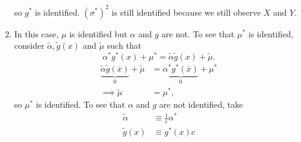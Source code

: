 \documentclass{article}
\begin{document}
\begin{enumerate}
\[\]
so $g^\ast$ is identified. $(\sigma^\ast)^2$ is still identified because we still observe $X$ and $Y$.
\item In this case, $\mu$ is identified but $\alpha$ and $g$ are not. To see that $\mu^\ast$ is identified, consider $\tilde{\alpha}, \tilde{g}(x)$ and $\tilde{\mu}$ such that
  \[
\alpha^\ast g^\ast(x) + \mu^\ast = \tilde{\alpha}\tilde{g}(x) + \tilde{\mu}.
\]
\begin{align*}
  \underbrace{\tilde{\alpha}\tilde{g}(\overline{x})}_{0} + \tilde{\mu} &= \underbrace{\alpha^\ast g^\ast(\overline{x})}_0 + \mu^\ast\\
  \implies \tilde{\mu} &= \mu^\ast,
\end{align*}
so $\mu^\ast$ is identified. To see that $\alpha$ and $g$ are not identified, take
\begin{align*}
  \tilde{\alpha} &\equiv \frac{1}{c} \alpha^\ast\\
  \tilde{g} (x) &\equiv g^\ast(x) c
\end{align*}
\end{enumerate}
\end{document}
